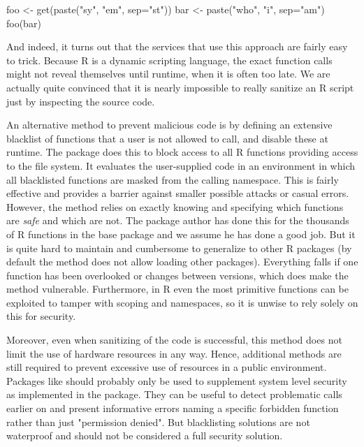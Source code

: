 \documentclass{jss}
\newcommand{\R}{\textsf{R}\xspace}
\newcommand{\RAppArmor}{\pkg{RAppArmor}\xspace}
\begin{document}
\begin{CodeChunk}
\begin{CodeInput}
foo <- get(paste("sy", "em", sep="st"))
bar <- paste("who", "i", sep="am")
foo(bar)
\end{CodeInput}
\end{CodeChunk}

And indeed, it turns out that the services that use this approach are fairly
easy to trick. Because \R is a dynamic scripting language, the exact function
calls might not reveal themselves until runtime, when it is often too late. We
are actually quite convinced that it is nearly impossible to really sanitize an
\R script just by inspecting the source code.

An alternative method to prevent malicious code is by defining an extensive
blacklist of functions that a user is not allowed to call, and disable these at
runtime. The  package \citep{sandboxR}  does this to block access
to all \R functions providing access to the file system. It evaluates the
user-supplied code in an environment in which all blacklisted functions are
masked from the calling namespace. This is fairly effective and provides a
barrier against smaller possible attacks or casual errors. However, the method
relies on exactly knowing and specifying which functions are \emph{safe} and
which are not. The package author has done this for the thousands of \R
functions in the base package and we assume he has done a good job. But it is
quite hard to maintain and cumbersome to generalize to other \R packages (by
default the method does not allow loading other packages). Everything falls if
one function has been overlooked or changes between versions, which does make
the method vulnerable. Furthermore, in \R even the most primitive functions can
be exploited to tamper with scoping and namespaces, so it is unwise to rely
solely on this for security.

Moreover, even when sanitizing of the code is successful, this method does not
limit the use of hardware resources in any way. Hence, additional methods are
still required to prevent excessive use of resources in a public environment.
Packages like  should probably only be used to supplement system
level security as implemented in the \RAppArmor package. They can be useful to
detect problematic calls earlier on and present informative errors naming a
specific forbidden function rather than just "permission denied". But
blacklisting solutions are not waterproof and should not be considered a full
security solution.
\end{document}
